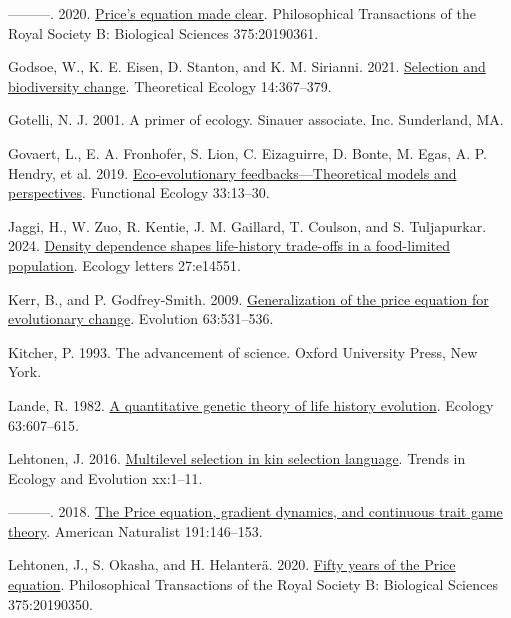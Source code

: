 \documentclass[
]{article}
\newlength{\cslhangindent}
\newenvironment{CSLReferences}[2] %
 {\begin{list}{}{%
  \setlength{\itemindent}{0pt}
  \setlength{\leftmargin}{0pt}
  \setlength{\parsep}{0pt}
  \ifodd #1
   \setlength{\leftmargin}{\cslhangindent}
   \setlength{\itemindent}{-1\cslhangindent}
  \fi
  \setlength{\itemsep}{#2\baselineskip}}}
 {\end{list}}
\begin{document}
\begin{CSLReferences}{0}{0}
---------. 2020. \href{https://doi.org/10.1098/rstb.2019.0361}{{Price's
equation made clear}}. Philosophical Transactions of the Royal Society
B: Biological Sciences 375:20190361.

Godsoe, W., K. E. Eisen, D. Stanton, and K. M. Sirianni. 2021.
\href{https://doi.org/10.1007/s12080-020-00478-3}{Selection and
biodiversity change}. Theoretical Ecology 14:367--379.

Gotelli, N. J. 2001. A primer of ecology. Sinauer associate. Inc.
Sunderland, MA.

Govaert, L., E. A. Fronhofer, S. Lion, C. Eizaguirre, D. Bonte, M. Egas,
A. P. Hendry, et al. 2019.
\href{https://doi.org/10.1111/1365-2435.13241}{{Eco-evolutionary
feedbacks---Theoretical models and perspectives}}. Functional Ecology
33:13--30.

Jaggi, H., W. Zuo, R. Kentie, J. M. Gaillard, T. Coulson, and S.
Tuljapurkar. 2024. \href{https://doi.org/10.1111/ele.14551}{Density
dependence shapes life-history trade-offs in a food-limited population}.
Ecology letters 27:e14551.

Kerr, B., and P. Godfrey-Smith. 2009.
\href{https://doi.org/10.1111/j.1558-5646.2008.00570.x}{{Generalization
of the price equation for evolutionary change}}. Evolution 63:531--536.

Kitcher, P. 1993. {The advancement of science}. Oxford University Press,
New York.

Lande, R. 1982. \href{https://doi.org/10.2307/1936778}{{A quantitative
genetic theory of life history evolution}}. Ecology 63:607--615.

Lehtonen, J. 2016.
\href{https://doi.org/10.1016/j.tree.2016.07.006}{{Multilevel selection
in kin selection language}}. Trends in Ecology and Evolution xx:1--11.

---------. 2018. \href{https://doi.org/10.1086/694891}{{The Price
equation, gradient dynamics, and continuous trait game theory}}.
American Naturalist 191:146--153.

Lehtonen, J., S. Okasha, and H. Helanterä. 2020.
\href{https://doi.org/10.1098/rstb.2019.0350}{{Fifty years of the Price
equation}}. Philosophical Transactions of the Royal Society B:
Biological Sciences 375:20190350.


\end{CSLReferences}
\end{document}
